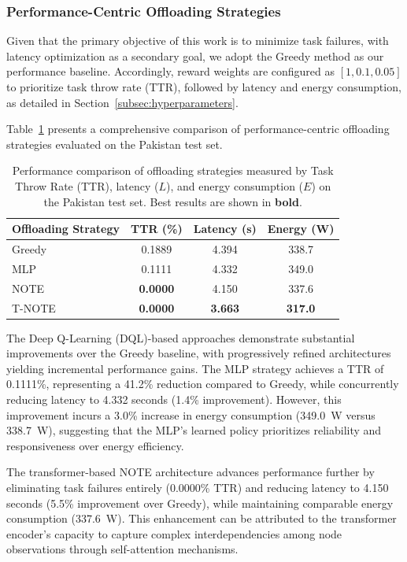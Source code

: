 \documentclass[preprint,3p,authoryear]{elsarticle}
\begin{document}
\subsubsection{Performance-Centric Offloading Strategies}\label{subsec:comparison_of_offloading_strategies}

Given that the primary objective of this work is to minimize task failures, with latency optimization as a secondary goal, we adopt the Greedy method as our performance baseline. Accordingly, reward weights are configured as $[1, 0.1, 0.05]$ to prioritize task throw rate (TTR), followed by latency and energy consumption, as detailed in Section~\ref{subsec:hyperparameters}.

Table~\ref{tab:results_comparison} presents a comprehensive comparison of performance-centric offloading strategies evaluated on the Pakistan test set. 

\begin{table}[htbp]
\centering
\begin{tabular}{lccc}
\toprule
\textbf{Offloading Strategy} & \textbf{TTR (\%)} & \textbf{Latency (s)} & \textbf{Energy (W)} \\
\midrule
Greedy 
 & 0.1889
 & 4.394
 & 338.7 \\
\midrule
MLP 
 & 0.1111
 & 4.332
 & 349.0 \\
NOTE 
 & \textbf{0.0000} 
 & 4.150
 & 337.6 \\
T-NOTE 
 & \textbf{0.0000} 
 & \textbf{3.663} 
 & \textbf{317.0} \\
\bottomrule
\end{tabular}
\caption{Performance comparison of offloading strategies measured by Task Throw Rate (TTR), latency ($L$), and energy consumption ($E$) on the Pakistan test set. Best results are shown in \textbf{bold}.}
\label{tab:results_comparison}
\end{table}

The Deep Q-Learning (DQL)-based approaches demonstrate substantial improvements over the Greedy baseline, with progressively refined architectures yielding incremental performance gains. The MLP strategy achieves a TTR of 0.1111\%, representing a 41.2\% reduction compared to Greedy, while concurrently reducing latency to 4.332 seconds (1.4\% improvement). However, this improvement incurs a 3.0\% increase in energy consumption (349.0~W versus 338.7~W), suggesting that the MLP's learned policy prioritizes reliability and responsiveness over energy efficiency.

The transformer-based NOTE architecture advances performance further by eliminating task failures entirely (0.0000\% TTR) and reducing latency to 4.150 seconds (5.5\% improvement over Greedy), while maintaining comparable energy consumption (337.6~W). This enhancement can be attributed to the transformer encoder's capacity to capture complex interdependencies among node observations through self-attention mechanisms.
\end{document}
